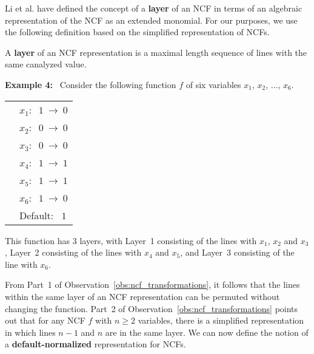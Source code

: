 Li et al. \cite{Li-etal-2013} have defined the concept of a 
{\bf layer} of an NCF in terms of
an algebraic representation of the NCF as an extended monomial.
For our purposes, we use the following definition based on the
simplified representation of NCFs.

\begin{definition}
\label{def:layer}
A {\bf layer} of an NCF representation is a maximal length sequence 
of lines with the same canalyzed value.
\end{definition}

\noindent
\textbf{Example 4:}~ Consider the following function $f$ of six variables
$x_1$, $x_2$, $\ldots$, $x_6$. 

\bigskip

\noindent
\begin{tabular}{ll}
\hspace*{0.25in} & $x_1:~$  $1 ~\longrightarrow~ 0$ \\ [0.5ex]
\hspace*{0.25in} & $x_2:~$  $0 ~\longrightarrow~ 0$ \\ [0.5ex]
\hspace*{0.25in} & $x_3:~$  $0 ~\longrightarrow~ 0$ \\ [0.5ex]
\hspace*{0.25in} & $x_4:~$  $1 ~\longrightarrow~ 1$ \\ [0.5ex]
\hspace*{0.25in} & $x_5:~$  $1 ~\longrightarrow~ 1$ \\ [0.5ex]
\hspace*{0.25in} & $x_6:~$  $1 ~\longrightarrow~ 0$ \\ [0.5ex]
\hspace*{0.25in} & Default:~ $1$ \\
\end{tabular}

\medskip
\noindent
This function has 3 layers, with 
Layer~1 consisting of the lines with $x_1$, $x_2$ and $x_3$, 
Layer~2 consisting of the lines with $x_4$ and $x_5$, and
Layer~3 consisting of the line with $x_6$.  %

\medskip
From Part~1 of Observation~\ref{obs:ncf_transformations},
it follows that the lines within the same layer of an NCF
representation can be permuted without changing the function.
Part~2 of Observation~\ref{obs:ncf_transformations} points
out that for any NCF $f$ with $n \geq 2$ variables, there is a simplified 
representation in which lines $n-1$ and $n$ are in the same layer.
We can now define the notion of a \textbf{default-normalized} 
representation for NCFs.

